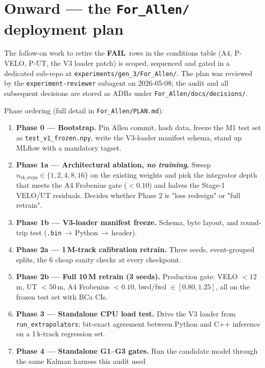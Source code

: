\documentclass[11pt,a4paper]{article}
\newcommand{\FAIL}{\textcolor{red!70!black}{\textbf{FAIL}}}
\begin{document}
\section{Onward --- the \texttt{For\_Allen/} deployment plan}

The follow-on work to retire the \FAIL\ rows in the conditions table
(A4, P-VELO, P-UT, the V3 loader patch) is scoped, sequenced and gated
in a dedicated sub-repo at
\texttt{experiments/gen\_3/For\_Allen/}. The plan was reviewed by the
\texttt{experiment-reviewer} subagent on 2026-05-08; the audit and
all subsequent decisions are stored as ADRs under
\texttt{For\_Allen/docs/decisions/}.

Phase ordering (full detail in \texttt{For\_Allen/PLAN.md}):

\begin{enumerate}[leftmargin=2em,nosep]
\item \textbf{Phase 0 --- Bootstrap.} Pin Allen commit, hash data,
      freeze the M1 test set as \texttt{test\_v1\_frozen.npy}, write
      the V3-loader manifest schema, stand up MLflow with a
      mandatory tagset.
\item \textbf{Phase 1a --- Architectural ablation, \emph{no
      training}.} Sweep \(n_\mathrm{rk\_steps}\in\{1,2,4,8,16\}\) on
      the existing weights and pick the integrator depth that meets
      the A4 Frobenius gate (\(<0.10\)) and halves the Stage-1
      VELO/UT residuals. Decides whether Phase 2 is "loss redesign"
      or "full retrain".
\item \textbf{Phase 1b --- V3-loader manifest freeze.} Schema, byte
      layout, and round-trip test (\texttt{.bin}\,$\to$\,Python\,$\to$\,header).
\item \textbf{Phase 2a --- 1\,M-track calibration retrain.} Three
      seeds, event-grouped splits, the 6 cheap sanity checks at every
      checkpoint.
\item \textbf{Phase 2b --- Full 10\,M retrain (3 seeds).} Production
      gate: VELO \(<\!12\,\)\textmu m, UT \(<\!50\,\)\textmu m, A4
      Frobenius \(<\!0.10\), bwd/fwd \(\in[0.80,1.25]\), all on the
      frozen test set with BCa CIs.
\item \textbf{Phase 3 --- Standalone CPU load test.} Drive the V3
      loader from \texttt{run\_extrapolators}; bit-exact agreement
      between Python and C++ inference on a 1\,k-track regression set.
\item \textbf{Phase 4 --- Standalone G1--G3 gates.} Run the
      candidate model through the same Kalman harness this audit used

\end{enumerate}
\end{document}
